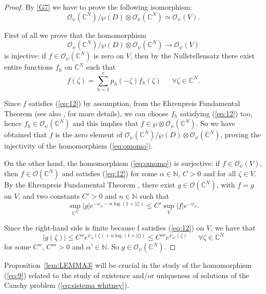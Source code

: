 \documentclass[twoside]{amsart}
\begin{document}
\begin{proof}
  By \eqref{G7} we have to prove the following isomorphism:
\[
{\mathcal O}_{\psi}(\mathbb{C}^{N})\bigl/\wp(D)\otimes{\mathcal O}_{\psi}
(\mathbb{C}^{N})
\simeq{\mathcal O}_{\psi}(V).
\]

First of all we prove that the homomorphism 
\begin{equation}
{\mathcal O}_{\psi}(\mathbb{C}^{N})\bigl/\wp(D)\otimes{\mathcal O}_{\psi}
(\mathbb{C}^{N})
\rightarrow{\mathcal O}_{\psi}(V)
\label{eq:omomo}
\end{equation}
is injective: if $f\in{\mathcal O}_{\psi}(\mathbb{C}^{N})$ is zero on
$V$, then by the Nullstellensatz there exist entire functions $f_{h}$ on
$\mathbb{C}^{N}$ such that
\[
f(\zeta)=\sum_{h=1}^{r}p_{h}(-\zeta)f_{h}(\zeta)
\,\,\,\,\,\,\,\,\,\forall\zeta\in\mathbb{C}^{N}.
\]

Since $f$ satisfies (\ref{eq:12}) by assumption, from the Ehrenpreis 
Fundamental Theorem \cite[Thm. 7.7.13]{H3} (see also \cite{B}, \cite{G}
for more details), we can choose $f_{h}$ satisfying (\ref{eq:12})
too, hence $f_{h}\in{\mathcal O}_{\psi}(\mathbb{C}^{N})$ and this implies
that $f\in\wp\otimes{\mathcal O}_{\psi}(\mathbb{C}^{N})$. So we have
obtained that $f$ is the zero element of 
${\mathcal O}_{\psi}(\mathbb{C}^{N})\bigl/
\wp(D)\otimes{\mathcal O}_{\psi}(\mathbb{C}^{N})$,
proving the injectivity of the homomorphism (\ref{eq:omomo}).

On the other hand, the homomorphism (\ref{eq:omomo}) is surjective:
if $f\in{\mathcal O}_{\psi}(V)$, then $f\in{\mathcal O}(\mathbb{C}^{N})$
and satisfies (\ref{eq:12}) for some $\alpha\in{\mathbb N}$, $C>0$ and for
all $\zeta\in V$. By the Ehrenpreis Fundamental Theorem \cite[Thm. 7.7.13]{H3},
there exist $g\in{\mathcal O}(\mathbb{C}^{N})$, with $f=g$ on $V$,
and two constants $C'>0$ and $n\in{\mathbb N}$ such that 
\[
\underset{\mathbb{C}^{N}}{\sup}|g|e^{-\psi_{\alpha}-n\log(1+|\zeta|)}
\leq C'\underset{V}{\sup}|f|e^{-\psi_{\alpha}}.
\]

Since the right-hand side is finite because f satisfies
(\ref{eq:12}) on $V$, we have that 
\[
|g(\zeta)|\leq C''e^{\psi_{\alpha}(\zeta)+n\log(1+|\zeta|)}
\leq C'''e^{\psi_{\alpha'}(\zeta)}
\,\,\,\,\,\,\,\,\,\forall\zeta\in\mathbb{C}^{N}
\]
for some $C'',\,C'''>0$ and $\alpha'\in{\mathbb N}$. 
So $g\in{\mathcal O}_{\psi}(\mathbb{C}^{N})$.
\end{proof}

Proposition~\ref{lem:LEMMA3} will be crucial in the study of the homomorphism
(\ref{eq:9}) related to the study of existence and/or uniqueness 
of solutions of the
Cauchy problem (\ref{eq:sistema whitney}). 
\end{document}
